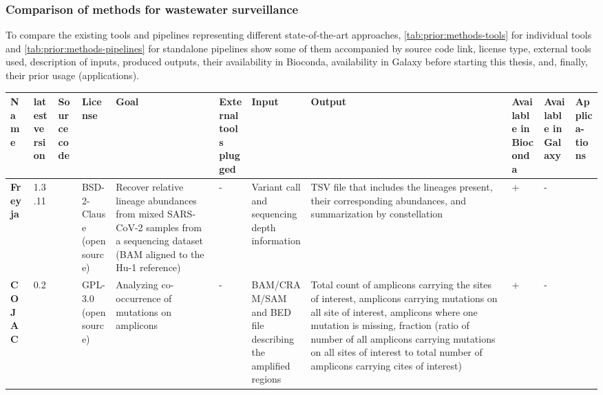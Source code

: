         \subsubsection{Comparison of methods for wastewater surveillance} \label{sec:prior:methods:comparison}
        To compare the existing tools and pipelines representing different state-of-the-art approaches, \cref{tab:prior:methods-tools} for individual tools and \cref{tab:prior:methods-pipelines} for standalone pipelines show some of them accompanied by source code link, license type, external tools used, description of inputs, produced outputs, their availability in Bioconda, availability in Galaxy before starting this thesis, and, finally, their prior usage (applications).
        \begin{landscape}
            \centering\vspace*{\fill}
                \begin{table}[ht!]
                \tiny
                \begin{tabular}{l|l|l|l|l|l|l|l|l|l|l}
\multicolumn{1}{m{1cm}|}{\textbf{Name}}&\multicolumn{1}{m{0.7cm}|}{\textbf{latest version}}&\multicolumn{1}{m{0.7cm}|}{\textbf{Source code}}&\multicolumn{1}{m{0.75cm}|}{\textbf{License}}&\multicolumn{1}{m{3cm}|}{\textbf{Goal}}&\multicolumn{1}{m{3cm}|}{\textbf{External tools plugged}}&\multicolumn{1}{m{3cm}|}{\textbf{Input}}&\multicolumn{1}{m{3cm}|}{\textbf{Output}}&\multicolumn{1}{m{1cm}|}{\textbf{Available in Bioconda}}&\multicolumn{1}{m{1cm}|}{\textbf{Available in Galaxy}}&\multicolumn{1}{m{1cm}}{\textbf{Applica- tions}}\\ \hline 
\multicolumn{1}{m{1cm}|}{\textbf{Freyja}}&\multicolumn{1}{m{0.7cm}|}{1.3.11}&\multicolumn{1}{m{0.7cm}|}{\cite{joshuailevy2022}}&\multicolumn{1}{m{0.75cm}|}{BSD-2-Clause (open source)}&\multicolumn{1}{m{3cm}|}{Recover relative lineage abundances from mixed SARS-CoV-2 samples from a sequencing dataset (BAM aligned to the Hu-1 reference)}&\multicolumn{1}{m{3cm}|}{-}&\multicolumn{1}{m{3cm}|}{Variant call and sequencing depth information}&\multicolumn{1}{m{3cm}|}{TSV file that includes the lineages present, their corresponding abundances, and summarization by constellation}&\multicolumn{1}{m{1cm}|}{+}&\multicolumn{1}{m{1cm}|}{-}&\multicolumn{1}{m{1cm}}{\cite{karthikeyan2022,solismoreira2022,nutrition2022,karthikeyan2022b}}\\ \hline 
\multicolumn{1}{m{1cm}|}{\textbf{COJAC}}&\multicolumn{1}{m{0.7cm}|}{0.2}&\multicolumn{1}{m{0.7cm}|}{\cite{cojac2022}}&\multicolumn{1}{m{0.75cm}|}{GPL-3.0 (open source)}&\multicolumn{1}{m{3cm}|}{Analyzing co-occurrence of mutations on amplicons}&\multicolumn{1}{m{3cm}|}{-}&\multicolumn{1}{m{3cm}|}{BAM/CRAM/SAM and BED file describing the amplified regions}&\multicolumn{1}{m{3cm}|}{Total count of amplicons carrying the sites of interest, amplicons carrying mutations on all site of interest, amplicons where one mutation is missing, fraction (ratio of number of all amplicons carrying mutations on all sites of interest to total number of amplicons carrying cites of interest) }&\multicolumn{1}{m{1cm}|}{+}&\multicolumn{1}{m{1cm}|}{-}&\multicolumn{1}{m{1cm}}{\cite{jahn2022,karthikeyan2022b,jbc}}\\ \hline 

\end{tabular}
\end{table}
\end{landscape}
